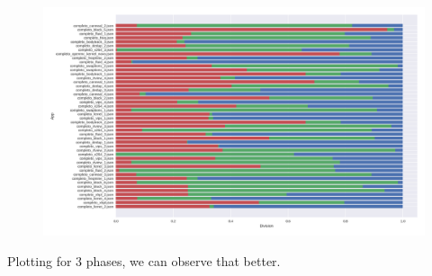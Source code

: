 \begin{figure}[H]
\includegraphics[width=\columnwidth]{phases/figures/phase_division_3.png}
\end{figure}
Plotting for 3 phases, we can observe that better.